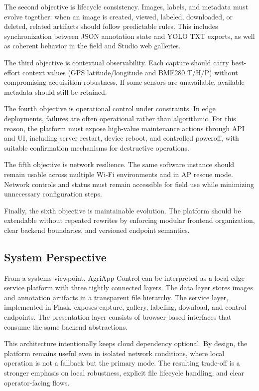 The second objective is lifecycle consistency. Images, labels, and metadata must evolve together: when an image is created, viewed, labeled, downloaded, or deleted, related artifacts should follow predictable rules. This includes synchronization between JSON annotation state and YOLO TXT exports, as well as coherent behavior in the field and Studio web galleries.

The third objective is contextual observability. Each capture should carry best-effort context values (GPS latitude/longitude and BME280 T/H/P) without compromising acquisition robustness. If some sensors are unavailable, available metadata should still be retained.

The fourth objective is operational control under constraints. In edge deployments, failures are often operational rather than algorithmic. For this reason, the platform must expose high-value maintenance actions through API and UI, including server restart, device reboot, and controlled poweroff, with suitable confirmation mechanisms for destructive operations.

The fifth objective is network resilience. The same software instance should remain usable across multiple Wi-Fi environments and in AP rescue mode. Network controls and status must remain accessible for field use while minimizing unnecessary configuration steps.

Finally, the sixth objective is maintainable evolution. The platform should be extendable without repeated rewrites by enforcing modular frontend organization, clear backend boundaries, and versioned endpoint semantics.

\subsection{System Perspective}
From a systems viewpoint, AgriApp Control can be interpreted as a local edge service platform with three tightly connected layers. The data layer stores images and annotation artifacts in a transparent file hierarchy. The service layer, implemented in Flask, exposes capture, gallery, labeling, download, and control endpoints. The presentation layer consists of browser-based interfaces that consume the same backend abstractions.

This architecture intentionally keeps cloud dependency optional. By design, the platform remains useful even in isolated network conditions, where local operation is not a fallback but the primary mode. The resulting trade-off is a stronger emphasis on local robustness, explicit file lifecycle handling, and clear operator-facing flows.

